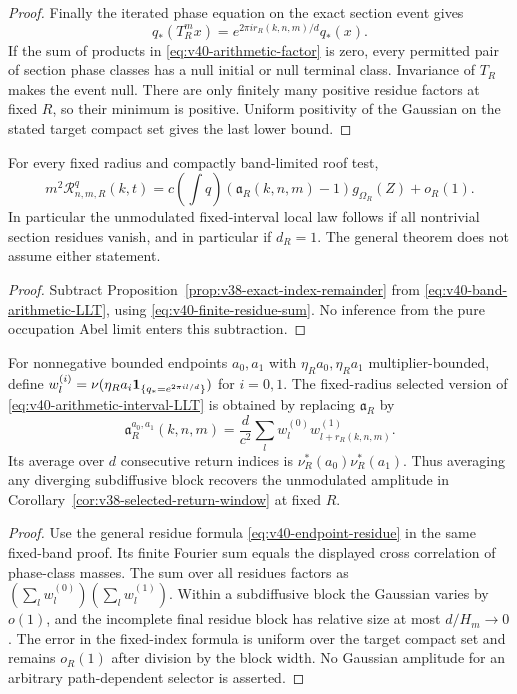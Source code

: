 \begin{proof}
Finally the iterated phase equation on the exact section event gives
\[
 q_*(T_R^m x)=e^{2\pi ir_R(k,n,m)/d}q_*(x).
\]
If the sum of products
in \eqref{eq:v40-arithmetic-factor} is zero, every permitted pair
of section phase classes has a null initial or null terminal class.
Invariance of $T_R$ makes the event null. There are only finitely many
positive residue factors at fixed $R$, so their minimum is positive.
Uniform positivity of the Gaussian on the stated target compact
set gives the last lower bound.
\end{proof}

\begin{corollary}
\label{cor:v40-explicit-fixed-complement}
For every fixed radius and compactly band-limited roof test,
\[
 m^2\mathcal R^q_{n,m,R}(k,t)
   =c\left(\int q\right)
       (\mathfrak a_R(k,n,m)-1)g_{\Omega_R}(Z)+o_R(1).
\]
In particular the unmodulated fixed-interval local law follows if all
nontrivial section residues vanish, and in particular if $d_R=1$.
The general theorem does not assume either statement.
\end{corollary}
\begin{proof}
Subtract Proposition~\ref{prop:v38-exact-index-remainder} from
\eqref{eq:v40-band-arithmetic-LLT}, using
\eqref{eq:v40-finite-residue-sum}. No inference from the pure
occupation Abel limit enters this subtraction.
\end{proof}

\begin{corollary}
\label{cor:v40-selected-arithmetic}
For nonnegative bounded endpoints $a_0,a_1$ with
$\eta_Ra_0,\eta_Ra_1$ multiplier-bounded, define
$w_l^{(i)}=\nu(\eta_Ra_i\mathbf1_{\{q_*=e^{2\pi il/d}\}})$ for $i=0,1$.
The fixed-radius selected version of
\eqref{eq:v40-arithmetic-interval-LLT} is obtained by
replacing $\mathfrak a_R$ by
\[
 \mathfrak a_R^{a_0,a_1}(k,n,m)
       =\frac d{c^2}\sum_lw_l^{(0)}w_{l+r_R(k,n,m)}^{(1)}.
\]
Its average over $d$ consecutive return indices is
$\nu_R^*(a_0)\nu_R^*(a_1)$. Thus averaging any diverging subdiffusive
block recovers the unmodulated amplitude in
Corollary~\ref{cor:v38-selected-return-window} at fixed $R$.
\end{corollary}
\begin{proof}
Use the general residue formula \eqref{eq:v40-endpoint-residue} in
the same fixed-band proof. Its finite Fourier sum equals the displayed
cross correlation of phase-class masses. The sum over all residues
factors as $(\sum_lw_l^{(0)})(\sum_lw_l^{(1)})$. Within a subdiffusive block
the Gaussian varies by $o(1)$, and the incomplete final residue block
has relative size at most $d/H_m\to0$. The error in the fixed-index
formula is uniform over the target compact set and remains $o_R(1)$
after division by the block width. No Gaussian amplitude for an
arbitrary path-dependent selector is asserted.
\end{proof}


